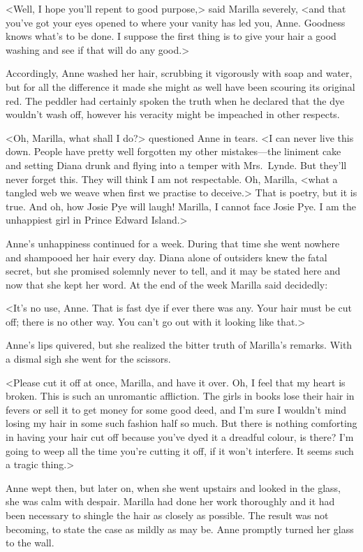 <Well, I hope you'll repent to good purpose,> said Marilla severely, <and that you've got your eyes opened to where your vanity has led you, Anne. Goodness knows what's to be done. I suppose the first thing is to give your hair a good washing and see if that will do any good.>

Accordingly, Anne washed her hair, scrubbing it vigorously with soap and water, but for all the difference it made she might as well have been scouring its original red. The peddler had certainly spoken the truth when he declared that the dye wouldn't wash off, however his veracity might be impeached in other respects.

<Oh, Marilla, what shall I do?> questioned Anne in tears. <I can never live this down. People have pretty well forgotten my other mistakes—the liniment cake and setting Diana drunk and flying into a temper with Mrs.~Lynde. But they'll never forget this. They will think I am not respectable. Oh, Marilla, <what a tangled web we weave when first we practise to deceive.> That is poetry, but it is true. And oh, how Josie Pye will laugh! Marilla, I cannot face Josie Pye. I am the unhappiest girl in Prince Edward Island.>

Anne's unhappiness continued for a week. During that time she went nowhere and shampooed her hair every day. Diana alone of outsiders knew the fatal secret, but she promised solemnly never to tell, and it may be stated here and now that she kept her word. At the end of the week Marilla said decidedly:

<It's no use, Anne. That is fast dye if ever there was any. Your hair must be cut off; there is no other way. You can't go out with it looking like that.>

Anne's lips quivered, but she realized the bitter truth of Marilla's remarks. With a dismal sigh she went for the scissors.

<Please cut it off at once, Marilla, and have it over. Oh, I feel that my heart is broken. This is such an unromantic affliction. The girls in books lose their hair in fevers or sell it to get money for some good deed, and I'm sure I wouldn't mind losing my hair in some such fashion half so much. But there is nothing comforting in having your hair cut off because you've dyed it a dreadful colour, is there? I'm going to weep all the time you're cutting it off, if it won't interfere. It seems such a tragic thing.>

Anne wept then, but later on, when she went upstairs and looked in the glass, she was calm with despair. Marilla had done her work thoroughly and it had been necessary to shingle the hair as closely as possible. The result was not becoming, to state the case as mildly as may be. Anne promptly turned her glass to the wall.

